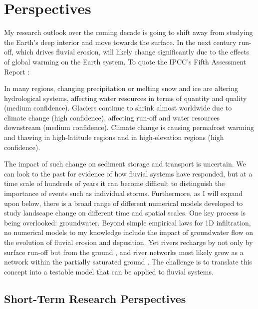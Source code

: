 \chapter{Perspectives}

My research outlook over the coming decade is going to shift away from studying the Earth's deep interior and move towards the surface. In the next century run-off, which drives fluvial erosion, will likely change significantly due to the effects of global warming on the Earth system. To quote the IPCC's Fifth Assessment Report \cite{IPCC-policy-2014}:

\begin{displayquote}
In many regions, changing precipitation or melting snow and ice are altering hydrological systems, affecting water resources in terms of quantity and quality (medium confidence). Glaciers continue to shrink almost worldwide due to climate change (high confidence), affecting run-off and water resources downstream (medium confidence). Climate change is causing permafrost warming and thawing in high-latitude regions and in high-elevation regions (high confidence).
\end{displayquote}

The impact of such change on sediment storage and transport is uncertain. We can look to the past for evidence of how fluvial systems have responded, but at a time scale of hundreds of years it can become difficult to distinguish the importance of events such as individual storms. Furthermore, as I will expand upon below, there is a broad range of different numerical models developed to study landscape change on different time and spatial scales. One key process is being overlooked: groundwater. Beyond simple empirical laws for 1D infiltration, no numerical models to my knowledge include the impact of groundwater flow on the evolution of fluvial erosion and deposition. Yet rivers recharge by not only by surface run-off but from the ground \citep[e.g.][]{condon-etal-2020}, and river networks most likely grow as a network within the partially saturated ground \citep[e.g.][]{devauchelle-etal-2017}. The challenge is to translate this concept into a testable model that can be applied to fluvial systems.

\section{Short-Term Research Perspectives}

